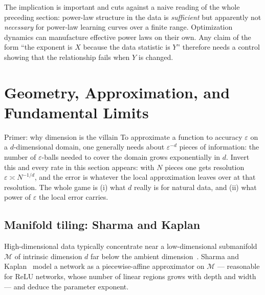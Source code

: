 \documentclass[11pt,a4paper]{article}
\theoremstyle{definition}
\begin{document}
The implication is important and cuts against a naive reading of the whole preceding section: power-law structure in the data is \emph{sufficient} but apparently not \emph{necessary} for power-law learning curves over a finite range. Optimization dynamics can manufacture effective power laws on their own. Any claim of the form ``the exponent is $X$ because the data statistic is $Y$'' therefore needs a control showing that the relationship fails when $Y$ is changed.

\section{Geometry, Approximation, and Fundamental Limits}
\label{sec:geometry_and_approximation}

\begin{intuition}{Primer: why dimension is the villain}
To approximate a function to accuracy $\varepsilon$ on a $d$-dimensional domain, one generally needs about $\varepsilon^{-d}$ pieces of information: the number of $\varepsilon$-balls needed to cover the domain grows exponentially in $d$. Invert this and every rate in this section appears: with $N$ pieces one gets resolution $\varepsilon\asymp N^{-1/d}$, and the error is whatever the local approximation leaves over at that resolution. The whole game is (i) what $d$ really is for natural data, and (ii) what power of $\varepsilon$ the local error carries.
\end{intuition}

\subsection{Manifold tiling: Sharma and Kaplan}
\label{subsec:sharma_kaplan}

High-dimensional data typically concentrate near a low-dimensional submanifold $\mathcal{M}$ of intrinsic dimension $d$ far below the ambient dimension~\cite{pope2021intrinsic,levina2004maximum,ansuini2019intrinsic}. Sharma and Kaplan~\cite{sharma2020neural} model a network as a piecewise-affine approximator on $\mathcal{M}$ --- reasonable for ReLU networks, whose number of linear regions grows with depth and width~\cite{montufar2014number} --- and deduce the parameter exponent.
\end{document}
